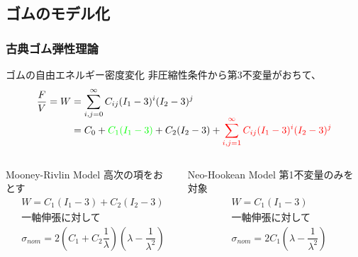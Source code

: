 \documentclass[12pt, dvipdfmx]{beamer}
\begin{document}
\subsection{ゴムのモデル化}
\begin{frame}
    \frametitle{古典ゴム弾性理論}
        \vspace{-2mm}
		\begin{block}{ゴムの自由エネルギー密度変化}
			非圧縮性条件から第3不変量がおちて、
			\footnotesize
			\begin{align*}
				\dfrac{F}{V} = W &= \sum_{i,j = 0}^{\infty} C_{ij}(I_1-3)^i(I_2-3)^j \\[-2mm]
				&= C_0 + {\color{green}C_1(I_1-3)} + C_2(I_2-3) + {\color{red}\sum_{i,j = 1}^{\infty} C_{ij}(I_1-3)^i(I_2-3)^j}
			\end{align*}  
		\end{block}
		\vspace{-5mm}
		\begin{columns}[T, onlytextwidth]
				\begin{alertblock}{Mooney-Rivlin Model}
					高次の項をおとす
					\footnotesize
					\begin{align*}
						&W = C_1 (I_1-3) + C_2(I_2-3) \\
						&\text{一軸伸張に対して} \\
						&\sigma_{nom} = 2 \left(C_1 + C_2\dfrac{1}{\lambda} \right) \left(\lambda - \dfrac{1}{\lambda^2}\right)
					\end{align*}
				\end{alertblock}
				\begin{exampleblock}{Neo-Hookean Model}
					第1不変量のみを対象
						\footnotesize
						\begin{align*}
							&W = C_1 (I_1-3) \\
							&\text{一軸伸張に対して} \\
							&\sigma_{nom} = 2 C_1\left(\lambda - \dfrac{1}{\lambda^2}\right)
						\end{align*}
				\end{exampleblock}
		\end{columns}     
\end{frame}
\end{document}
